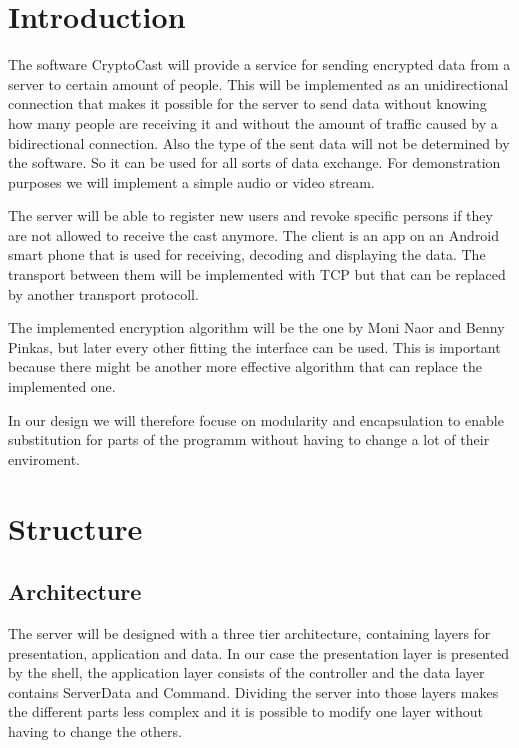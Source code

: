 \documentclass[a4paper,10pt]{scrartcl}
\title{\doctitle}
\author{\authorName}
\date{\today}
\begin{document}

\tableofcontents
\clearpage

\section{Introduction}


The software CryptoCast will provide a service for sending encrypted data from a server to certain
amount of people.  This will be implemented as an unidirectional connection that makes it possible for the server
to send data without knowing how many people are receiving it and without the amount of traffic caused
by a bidirectional connection.  Also the type of the sent data will not be determined by the software. So it can be
used for all sorts of data exchange. For demonstration purposes we will implement a simple audio or video stream.

The server will be able to register new users and revoke specific persons if they are not allowed to receive the cast anymore. 
The client is an app on an Android smart phone that is used for receiving, decoding and displaying the data. 
The transport between them will be implemented with TCP but that can be replaced by another transport protocoll.

The implemented encryption algorithm will be the one by Moni Naor and Benny Pinkas, but later every other fitting the
interface can be used. This is important because there might be another more effective algorithm that can replace the implemented one.

In our design we will therefore focuse on modularity and encapsulation to enable substitution for parts of the programm without having to 
change a lot of their enviroment.

\section{Structure}
\subsection{Architecture}
The server will be designed with a three tier architecture, containing layers for presentation, application and data. In our case 
the presentation layer is presented by the shell, the application layer consists of the controller and the data layer contains ServerData and Command. Dividing the server into those layers makes the different parts less complex and it is possible to modify one layer without having to change the others.
\end{document}
